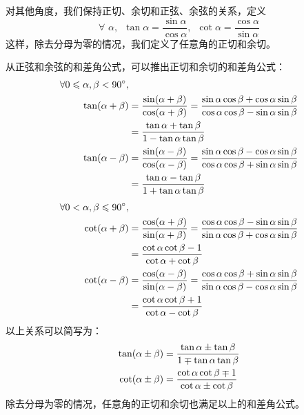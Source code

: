 \documentclass[12pt,UTF8]{ctexbook}
\begin{document}
对其他角度，我们保持正切、余切和正弦、余弦的关系，定义
$$ \forall \,\,  \alpha, \,\,\, \tan \alpha = \frac{\sin \alpha}{\cos \alpha}, \,\,\, \cot \alpha = \frac{\cos \alpha}{\sin \alpha}$$
这样，除去分母为零的情况，我们定义了任意角的正切和余切。

从正弦和余弦的和差角公式，可以推出正切和余切的和差角公式：
\begin{align}
    \forall 0 \leqslant \alpha, \beta < 90^\circ, & \notag \\
    \tan (\alpha + \beta) &= \frac{\sin (\alpha + \beta)}{\cos (\alpha + \beta)} = \frac{\sin\alpha \cos \beta + \cos \alpha \sin\beta}{\cos \alpha \cos \beta - \sin\alpha \sin \beta} \notag \\
    &= \frac{\tan \alpha + \tan \beta}{1 - \tan \alpha \tan \beta} \notag   \\ 
    \tan (\alpha - \beta) &= \frac{\sin (\alpha - \beta)}{\cos (\alpha - \beta)} = \frac{\sin\alpha \cos \beta - \cos \alpha \sin\beta}{\cos \alpha \cos \beta + \sin\alpha \sin \beta} \notag \\
    &= \frac{\tan \alpha - \tan \beta}{1 + \tan \alpha \tan \beta} \notag 
\end{align}
\begin{align}
    \forall 0 < \alpha, \beta \leqslant 90^\circ, & \notag \\
    \cot (\alpha + \beta) &= \frac{\cos (\alpha + \beta)}{\sin (\alpha + \beta)} = \frac{\cos \alpha \cos \beta - \sin\alpha \sin \beta}{\sin\alpha \cos \beta + \cos \alpha \sin\beta} \notag \\
    &= \frac{\cot \alpha \cot \beta - 1}{\cot \alpha + \cot \beta} \notag  \\
    \cot (\alpha - \beta) &= \frac{\cos (\alpha - \beta)}{\sin (\alpha - \beta)} = \frac{\cos \alpha \cos \beta + \sin\alpha \sin \beta}{\sin\alpha \cos \beta - \cos \alpha \sin\beta} \notag \\
    &= \frac{\cot \alpha \cot \beta + 1}{\cot \alpha - \cot \beta}  \notag 
\end{align}
以上关系可以简写为：
\begin{align}
    \tan (\alpha \pm \beta) &= \frac{\tan \alpha \pm \tan \beta}{1 \mp \tan \alpha \tan \beta} \notag \\
    \cot (\alpha \pm \beta) &= \frac{\cot \alpha \cot \beta \mp 1}{\cot \alpha \pm \cot \beta} \notag
\end{align}
除去分母为零的情况，任意角的正切和余切也满足以上的和差角公式。
\end{document}
